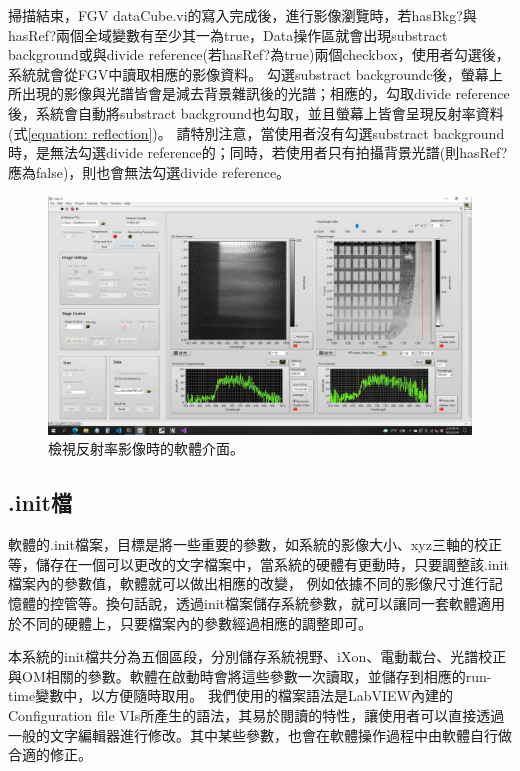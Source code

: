 \documentclass[12pt]{article}
\begin{document}
    掃描結束，FGV dataCube.vi的寫入完成後，進行影像瀏覽時，若hasBkg?與hasRef?兩個全域變數有至少其一為true，Data操作區就會出現substract background或與divide reference(若hasRef?為true)兩個checkbox，使用者勾選後，系統就會從FGV中讀取相應的影像資料。
    勾選substract backgroundc後，螢幕上所出現的影像與光譜皆會是減去背景雜訊後的光譜；相應的，勾取divide reference後，系統會自動將substract background也勾取，並且螢幕上皆會呈現反射率資料(式\ref{equation: reflection})。
    請特別注意，當使用者沒有勾選substract background時，是無法勾選divide reference的；同時，若使用者只有拍攝背景光譜(則hasRef?應為false)，則也會無法勾選divide reference。
    \begin{figure}[ht]
        \centering
        \includegraphics[width=\linewidth]{reflection.jpeg}
        \caption{檢視反射率影像時的軟體介面。}
        \label{figure: reflection}
    \end{figure}
    \subsection{.init檔}
    軟體的.init檔案，目標是將一些重要的參數，如系統的影像大小、xyz三軸的校正等，儲存在一個可以更改的文字檔案中，當系統的硬體有更動時，只要調整該.init檔案內的參數值，軟體就可以做出相應的改變，
    例如依據不同的影像尺寸進行記憶體的控管等。換句話說，透過init檔案儲存系統參數，就可以讓同一套軟體適用於不同的硬體上，只要檔案內的參數經過相應的調整即可。

    本系統的init檔共分為五個區段，分別儲存系統視野、iXon、電動載台、光譜校正與OM相關的參數。軟體在啟動時會將這些參數一次讀取，並儲存到相應的run-time變數中，以方便隨時取用。
    我們使用的檔案語法是LabVIEW內建的Configuration file VIs所產生的語法，其易於閱讀的特性，讓使用者可以直接透過一般的文字編輯器進行修改。其中某些參數，也會在軟體操作過程中由軟體自行做合適的修正。
\end{document}
